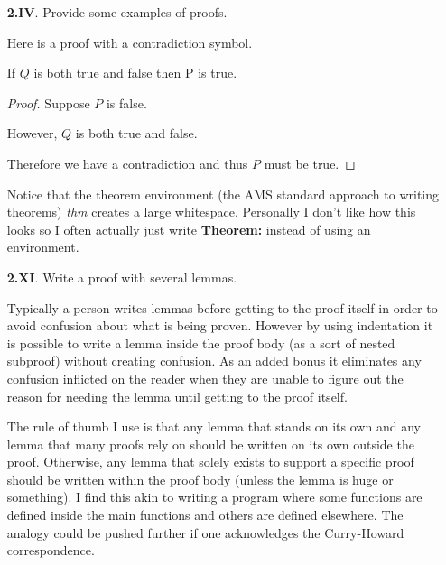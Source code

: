    \begin{enumerate}
      \item[\textbf{2.IV}.] %
        Provide some examples of proofs.

        \aspace

        Here is a proof with a contradiction symbol.
        \begin{thm}
          If $Q$ is both true and false then P is true.
        \end{thm}
        \renewcommand{\qedsymbol}{$\contradiction$}
        \begin{proof}
          Suppose $P$ is false.

          However, $Q$ is both true and false.

          Therefore we have a contradiction and thus $P$ must be true.
        \end{proof}
        \renewcommand{\qedsymbol}{$\square$}

        Notice that the theorem environment (the AMS standard approach to writing theorems) \textit{thm} creates a large whitespace. Personally I don't like how this looks so I often actually just write \textbf{Theorem:} instead of using an environment.

      \qspace

      \item[\textbf{2.XI}.]
        Write a proof with several lemmas.

        \aspace

        Typically a person writes lemmas before getting to the proof itself in order to avoid confusion about what is being proven. However by using indentation it is possible to write a lemma inside the proof body (as a sort of nested subproof) without creating confusion. As an added bonus it eliminates any confusion inflicted on the reader when they are unable to figure out the reason for needing the lemma until getting to the proof itself.

        The rule of thumb I use is that any lemma that stands on its own and any lemma that many proofs rely on should be written on its own outside the proof. Otherwise, any lemma that solely exists to support a specific proof should be written within the proof body (unless the lemma is huge or something). I find this akin to writing a program where some functions are defined inside the main functions and others are defined elsewhere. The analogy could be pushed further if one acknowledges the Curry-Howard correspondence.


\end{enumerate}
